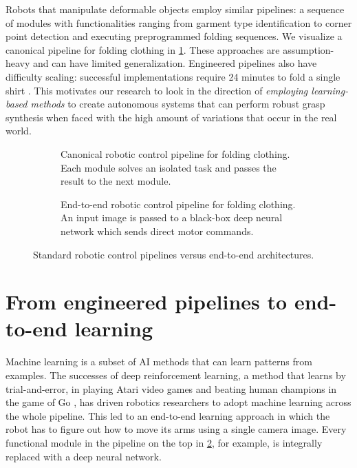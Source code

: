 \documentclass[\home/main.tex]{subfiles}
\begin{document}
Robots that manipulate deformable objects employ similar pipelines: a sequence of modules with functionalities ranging from garment type identification to corner point detection and executing preprogrammed folding sequences. We visualize a canonical pipeline for folding clothing in \cref{subfig:intro_canonical_control_pipeline}. These approaches are assumption-heavy and can have limited generalization. Engineered pipelines also have difficulty scaling: successful implementations require 24 minutes to fold a single shirt \autocite{Maitin2010}. This motivates our research to look in the direction of \emph{employing learning-based methods} to create autonomous systems that can perform robust grasp synthesis when faced with the high amount of variations that occur in the real world.

\begin{sidewaysfigure}
    \centering
    \begin{subfigure}[b]{1.0\textwidth}
        \centering
        
        \caption{Canonical robotic control pipeline for folding clothing. Each module solves an isolated task and passes the result to the next module.}
        \label{subfig:intro_canonical_control_pipeline}
    \end{subfigure}
    \par\bigskip %
    \begin{subfigure}[b]{1.0\textwidth}
        \centering
        
        \caption{End-to-end robotic control pipeline for folding clothing. An input image is passed to a black-box deep neural network which sends direct motor commands.}
        \label{subfig:intro_end2end}
    \end{subfigure}

    \caption[]{Standard robotic control pipelines versus end-to-end architectures.}
    \label{fig:intro_pipelines}
\end{sidewaysfigure}

\section{From engineered pipelines to end-to-end learning}
Machine learning is a subset of \gls{AI} methods that can learn patterns from examples. The successes of deep reinforcement learning, a method that learns by trial-and-error, in playing Atari video games \autocite{Mnih2015} and beating human champions in the game of Go \autocite{gaemofGo2016}, has driven robotics researchers to adopt machine learning across the whole pipeline. This led to an end-to-end learning approach in which the robot has to figure out how to move its arms using a single camera image. Every functional module in the pipeline on the top in \cref{subfig:intro_end2end}, for example, is integrally replaced with a deep neural network.
\end{document}
